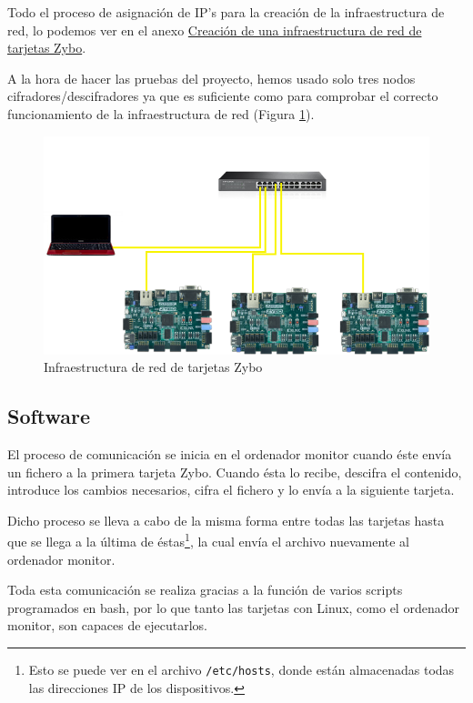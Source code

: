 Todo el proceso de asignación de IP's para la creación de la infraestructura de red, lo podemos ver en el anexo \hyperlink{CreacionInfraestructura}{Creación de una infraestructura de red de tarjetas Zybo}.

A la hora de hacer las pruebas del proyecto, hemos usado solo tres nodos cifradores/descifradores ya que es suficiente como para comprobar el correcto funcionamiento de la infraestructura de red (Figura \ref{Infraestructura de red de tarjetas Zybo}).

\begin{figure}[h]
	\centering
	\includegraphics[scale=0.5]{Epilogo/RedCompleta.png}
	\caption{Infraestructura de red de tarjetas Zybo}
	\label{Infraestructura de red de tarjetas Zybo}
\end{figure}

\subsection{Software}
El proceso de comunicación se inicia en el ordenador monitor cuando éste envía un fichero a la primera tarjeta Zybo. Cuando ésta lo recibe, descifra el contenido, introduce los cambios necesarios, cifra el fichero y lo envía a la siguiente tarjeta.

Dicho proceso se lleva a cabo de la misma forma entre todas las tarjetas hasta que se llega a la última de éstas\footnote{Esto se puede ver en el archivo \texttt{/etc/hosts}, donde están almacenadas todas las direcciones IP de los dispositivos.}, la cual envía el archivo nuevamente al ordenador monitor.

Toda esta comunicación se realiza gracias a la función de varios scripts programados en bash, por lo que tanto las tarjetas con Linux, como el ordenador monitor, son capaces de ejecutarlos.

